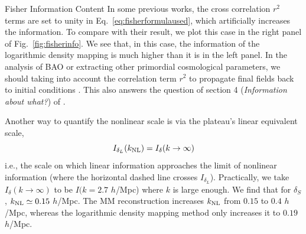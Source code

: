 \begin{section}{Fisher Information Content}
  In some previous works, the cross correlation $r^2$ terms are set
  to unity in Eq.~\ref{eq:fisherformulaused}, which artificially
  increases the information. To compare with their result, we plot this case in the right panel of 
  Fig.~\ref{fig:fisherinfo}.  We see that, in this case, the information of the logarithmic density
  mapping is much higher than it is in the left panel.
  In the analysis of BAO or extracting other primordial cosmological
  parameters, we should taking into account the correlation term $r^2$
  to propagate final fields back to initial conditions \citep{bib:HarnoisD2013}.
  This also answers the question of section 4
  ({\it Information about what?}) of \citet{bib:HarnoisD2013}.

  Another way to quantify the nonlinear scale is via the plateau's linear equivalent scale,
  \begin{equation}
      I_{\delta_L}(k_{\rm NL})=I_{\delta}(k\rightarrow\infty)
  \end{equation}
  i.e.,
  the scale on which linear information approaches the limit of nonlinear information
  (where the horizontal dashed line crosses $I_{\delta_{L}}$).
  Practically, we take $I_{\delta}(k\rightarrow\infty)$ to be
  $I(k=2.7$ $h$/Mpc) where $k$ is large enough.  We find that
  for $\delta_S$, $k_{\rm NL}\simeq 0.15$ $h$/Mpc.
  The MM reconstruction increases $k_{\rm NL}$ from $0.15$ to $0.4$ $h$/Mpc,
  whereas the logarithmic density mapping method only increases it to $0.19$ $h$/Mpc.


\end{section}
